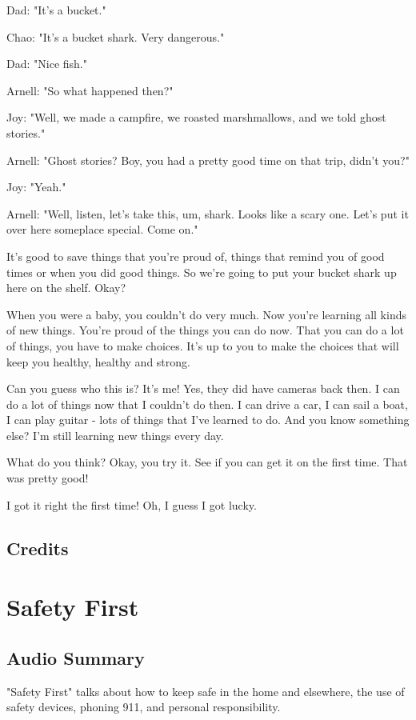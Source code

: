 Dad: "It's a bucket."

Chao: "It's a bucket shark. Very dangerous."

Dad: "Nice fish."

Arnell: "So what happened then?"

Joy: "Well, we made a campfire, we roasted marshmallows, and we told ghost stories."

Arnell: "Ghost stories? Boy, you had a pretty good time on that trip, didn't you?"

Joy: "Yeah."

Arnell: "Well, listen, let's take this, um, shark. Looks like a scary one. Let's put it over here someplace special. Come on."

It's good to save things that you're proud of, things that remind you of good times or when you did good things. So we're going to put your bucket shark up here on the shelf. Okay?

When you were a baby, you couldn't do very much. Now you're learning all kinds of new things. You're proud of the things you can do now. That you can do a lot of things, you have to make choices. It's up to you to make the choices that will keep you healthy, healthy and strong.

Can you guess who this is? It's me! Yes, they did have cameras back then. I can do a lot of things now that I couldn't do then. I can drive a car, I can sail a boat, I can play guitar - lots of things that I've learned to do. And you know something else? I'm still learning new things every day.

What do you think? Okay, you try it. See if you can get it on the first time. That was pretty good!

I got it right the first time! Oh, I guess I got lucky.

\subsection{Credits}

\section{Safety First}

\subsection{Audio Summary}

"Safety First" talks about how to keep safe in the home and elsewhere, the use of safety devices, phoning 911, and personal responsibility.

